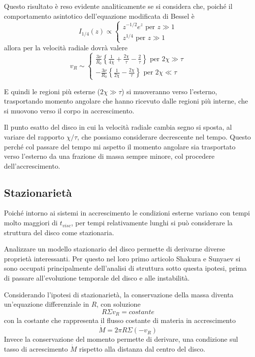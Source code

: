 \documentclass[a4paperbi]{article}
\begin{document}
	Questo risultato è reso evidente analiticamente se si considera che, poiché il comportamento asintotico dell'equazione modificata di Bessel è
	\begin{equation*}
		I_{1/4}(z)\propto\begin{cases}
				z^{-1/2}e^z\text{ per $z\gg1$}\\
				z^{1/4}\text{ per $z\gg1$}
			\end{cases}
	\end{equation*}	 
	allora per la velocità radiale dovrà valere
	\begin{equation*}
		v_R\sim\begin{cases}
			\frac{3\nu}{R_0}\left\{\frac{1}{4\chi}+\frac{2\chi}{\tau}-\frac{2}{\tau}\right\}\text{ per $2\chi\gg\tau$}\\
			-\frac{3\nu}{R_0}\left\{\frac{1}{2\chi}-\frac{2\chi}{\tau}\right\}\text{ per $2\chi\ll\tau$}			
			\end{cases}
	\end{equation*}
	
	E quindi le regioni più esterne ($2\chi\gg\tau$) si muoveranno verso l'esterno, trasportando momento angolare che hanno ricevuto dalle regioni più interne, che si muovono verso il corpo in accrescimento.
	
	Il punto esatto del disco in cui la velocità radiale cambia segno si sposta, al variare del rapporto $\chi/\tau$, che possiamo considerare decrescente nel tempo. Questo perché col passare del tempo mi aspetto il momento angolare sia trasportato verso l'esterno da una frazione di massa sempre minore, col procedere dell'accrescimento.
	
	\subsection{Stazionarietà}
	Poiché intorno ai sistemi in accrescimento le condizioni esterne variano con tempi molto maggiori di $t_{visc}$, per tempi relativamente lunghi si può considerare la struttura del disco come stazionaria.
	
	Analizzare un modello stazionario del disco permette di derivarne diverse proprietà interessanti. Per questo nel loro primo articolo Shakura e Sunyaev si sono occupati principalmente dell'analisi di struttura sotto 	questa ipotesi, prima di passare all'evoluzione temporale del disco e alle instabilità.
	
	Considerando l'ipotesi di stazionarietà, la conservazione della massa diventa un'equazione differenziale in $R$, con soluzione
	\begin{equation}
		R\Sigma v_R=costante
	\end{equation}
	con la costante che rappresenta il flusso costante di materia in accrescimento
	\begin{equation}
		\dot{M}=2\pi R\Sigma(-v_R)
	\end{equation}
	Invece la conservazione del momento permette di derivare, una condizione sul tasso di acrescimento $\dot{M}$ rispetto alla distanza dal centro del disco.
	
\end{document}
